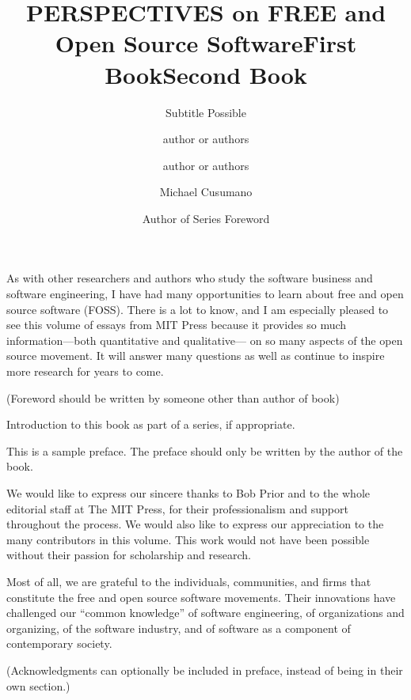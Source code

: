 \documentclass{mitpress}
\title{PERSPECTIVES on FREE and Open Source Software}
\subtitle{Subtitle Possible}
\title{First Book}
\author{author or authors}
\title{Second Book}
\author{author or authors}
\begin{document}

\titlepages 


\begin{foreword}
\author{Michael Cusumano}

As with other researchers and authors who study the software business
and software engineering, I have had many opportunities to learn about
free and open source software (FOSS). There is a lot to know, and I am
especially pleased to see this volume of essays from MIT Press because
it provides so much information---both quantitative and qualitative---%
on so many aspects of the open source movement. It will answer many
questions as well as continue to inspire more research for years to
come.


(Foreword should be written by someone other than author of book)
\end{foreword}

\begin{seriesforeword}
\author{Author of Series Foreword}

Introduction to this book as part of a series, if appropriate.
\end{seriesforeword}

\begin{preface}
This is a sample preface. The preface should only
be written by the author of the book.

\end{preface}


\begin{acknowledgment}
We would like to express our sincere thanks to Bob Prior and to the whole
editorial staff at The MIT Press, for their professionalism and support
throughout the process. We would also like to express our appreciation to
the many contributors in this volume. This work would not have been possible
without their passion for scholarship and research.

Most of all, we are grateful to the individuals, communities, and firms
that constitute the free and open source software movements. Their innovations
have challenged our ``common knowledge'' of software engineering,
of organizations and organizing, of the software industry, and of
software as a component of contemporary society.


(Acknowledgments can optionally be included in preface, instead of
being in their own section.)
\end{acknowledgment}
\end{document}
